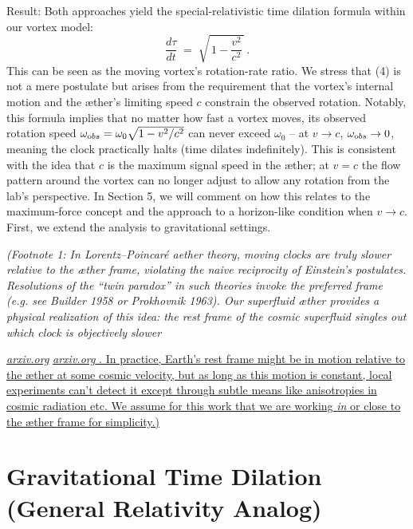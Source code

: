 \documentclass[aps,preprint,superscriptaddress]{revtex4}
\begin{document}
Result: Both approaches yield the special-relativistic time dilation formula within our vortex model:
\begin{equation}
\boxed{\frac{d\tau}{dt} \;=\; \sqrt{\,1-\frac{v^2}{c^2}\,}\,.} \tag{4}
\end{equation}
This can be seen as the moving vortex’s rotation-rate ratio. We stress that (4) is not a mere postulate but arises from the requirement that the vortex’s internal motion and the æther’s limiting speed $c$ constrain the observed rotation. Notably, this formula implies that no matter how fast a vortex moves, its observed rotation speed $\omega_{\textrm obs}=\omega_0\sqrt{1-v^2/c^2}$ can never exceed $\omega_0$ – at $v\to c$, $\omega_{\textrm obs}\to 0$, meaning the clock practically halts (time dilates indefinitely). This is consistent with the idea that $c$ is the maximum signal speed in the æther; at $v=c$ the flow pattern around the vortex can no longer adjust to allow any rotation from the lab’s perspective. In Section 5, we will comment on how this relates to the maximum-force concept and the approach to a horizon-like condition when $v\to c$. First, we extend the analysis to gravitational settings.


\textit{(Footnote 1: In Lorentz–Poincaré aether theory, moving clocks are truly slower relative to the æther frame, violating the naive reciprocity of Einstein’s postulates. Resolutions of the “twin paradox” in such theories invoke the preferred frame (e.g. see Builder 1958 or Prokhovnik 1963). Our superfluid æther provides a physical realization of this idea: the rest frame of the cosmic superfluid singles out which clock is objectively slower }

\href{https://arxiv.org/pdf/physics/0611077#:~:text=We%20should%20note%20that%2C%20when,a%20state%20of%20absolute%20rest}{\textit{arxiv.org}}
\href{https://arxiv.org/pdf/physics/0611077#:~:text=The%20resolution%20of%20the%20paradoxes,ordinate}{\textit{arxiv.org}
. In practice, Earth’s rest frame might be in motion relative to the æther at some cosmic velocity, but as long as this motion is constant, local experiments can’t detect it except through subtle means like anisotropies in cosmic radiation etc. We assume for this work that we are working \textit{in} or close to the æther frame for simplicity.)}


\section*{Gravitational Time Dilation (General Relativity Analog)}
\end{document}
